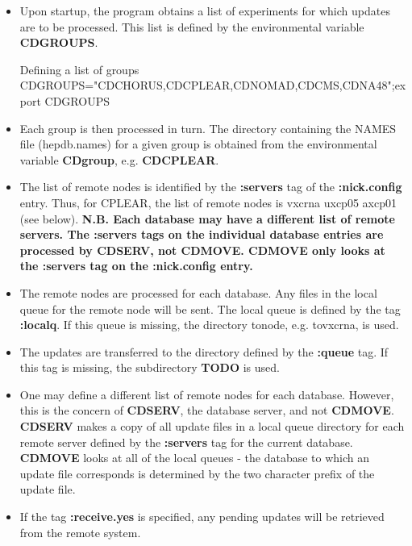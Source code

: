\begin{itemize}
\item
Upon startup, the program obtains a list of experiments
for which updates are to be processed. This list is defined by
the environmental variable {\bf CDGROUPS}.

\begin{XMPt}{Defining a list of groups}
CDGROUPS="CDCHORUS,CDCPLEAR,CDNOMAD,CDCMS,CDNA48";export CDGROUPS
\end{XMPt}

\item
Each group is then processed in turn. The directory containing
the NAMES file (hepdb.names) for a given group is obtained from the environmental
variable {\bf CDgroup}, e.g. {\bf CDCPLEAR}.

\item
The list of remote nodes is identified by the {\bf :servers} tag of
the {\bf :nick.config} entry. Thus, for CPLEAR, the list of remote
nodes is vxcrna uxcp05 axcp01 (see below).
{\bf N.B. Each database may have a different list of remote
servers. The :servers tags on the individual database entries
are processed by CDSERV, not CDMOVE. CDMOVE only looks at
the :servers tag on the :nick.config entry.}

\item
The remote nodes are processed for each database. Any files
in the local queue for the remote node will be sent.
The local queue is defined by the tag {\bf :localq}.
If this queue is missing, the directory tonode, e.g.
tovxcrna, is used.

\item
The updates are transferred to the directory 
defined by the {\bf :queue} tag. If this tag is
missing, the subdirectory {\bf TODO} is used.

\item
One may define a different list of remote nodes for each
database. However, this is the concern of {\bf CDSERV},
the database server, and not {\bf CDMOVE}. {\bf CDSERV}
makes a copy of all update files in a local queue directory
for each remote server defined by the {\bf :servers} tag
for the current database. {\bf CDMOVE} looks at all
of the local queues - the database to which an update
file corresponds is determined by the two character
prefix of the update file.

\item
If the tag {\bf :receive.yes} is specified, any pending updates
will be retrieved from the remote system.


\end{itemize}
